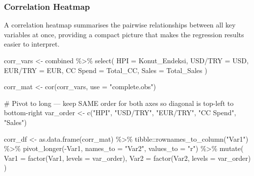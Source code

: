 \documentclass[
  11pt,
  a4paper,
]{article}
\newenvironment{Shaded}{\begin{snugshade}}{\end{snugshade}}
\newcommand{\AttributeTok}[1]{\textcolor[rgb]{0.40,0.45,0.13}{#1}}
\newcommand{\CommentTok}[1]{\textcolor[rgb]{0.37,0.37,0.37}{#1}}
\newcommand{\FunctionTok}[1]{\textcolor[rgb]{0.28,0.35,0.67}{#1}}
\newcommand{\NormalTok}[1]{\textcolor[rgb]{0.00,0.23,0.31}{#1}}
\newcommand{\OtherTok}[1]{\textcolor[rgb]{0.00,0.23,0.31}{#1}}
\newcommand{\SpecialCharTok}[1]{\textcolor[rgb]{0.37,0.37,0.37}{#1}}
\newcommand{\StringTok}[1]{\textcolor[rgb]{0.13,0.47,0.30}{#1}}
\begin{document}
\subsubsection{Correlation Heatmap}\label{correlation-heatmap}

A correlation heatmap summarises the pairwise relationships between all
key variables at once, providing a compact picture that makes the
regression results easier to interpret.

\begin{Shaded}
\begin{Highlighting}[]
\NormalTok{corr\_vars }\OtherTok{\textless{}{-}}\NormalTok{ combined }\SpecialCharTok{\%\textgreater{}\%}
  \FunctionTok{select}\NormalTok{(}
    \AttributeTok{HPI        =}\NormalTok{ Konut\_Endeksi,}
    \StringTok{\textasciigrave{}}\AttributeTok{USD/TRY}\StringTok{\textasciigrave{}}  \OtherTok{=}\NormalTok{ USD,}
    \StringTok{\textasciigrave{}}\AttributeTok{EUR/TRY}\StringTok{\textasciigrave{}}  \OtherTok{=}\NormalTok{ EUR,}
    \StringTok{\textasciigrave{}}\AttributeTok{CC Spend}\StringTok{\textasciigrave{}} \OtherTok{=}\NormalTok{ Total\_CC,}
    \AttributeTok{Sales      =}\NormalTok{ Total\_Sales}
\NormalTok{  )}

\NormalTok{corr\_mat }\OtherTok{\textless{}{-}} \FunctionTok{cor}\NormalTok{(corr\_vars, }\AttributeTok{use =} \StringTok{"complete.obs"}\NormalTok{)}

\CommentTok{\# Pivot to long — keep SAME order for both axes so diagonal is top{-}left to bottom{-}right}
\NormalTok{var\_order }\OtherTok{\textless{}{-}} \FunctionTok{c}\NormalTok{(}\StringTok{"HPI"}\NormalTok{, }\StringTok{"USD/TRY"}\NormalTok{, }\StringTok{"EUR/TRY"}\NormalTok{, }\StringTok{"CC Spend"}\NormalTok{, }\StringTok{"Sales"}\NormalTok{)}

\NormalTok{corr\_df }\OtherTok{\textless{}{-}} \FunctionTok{as.data.frame}\NormalTok{(corr\_mat) }\SpecialCharTok{\%\textgreater{}\%}
\NormalTok{  tibble}\SpecialCharTok{::}\FunctionTok{rownames\_to\_column}\NormalTok{(}\StringTok{"Var1"}\NormalTok{) }\SpecialCharTok{\%\textgreater{}\%}
  \FunctionTok{pivot\_longer}\NormalTok{(}\SpecialCharTok{{-}}\NormalTok{Var1, }\AttributeTok{names\_to =} \StringTok{"Var2"}\NormalTok{, }\AttributeTok{values\_to =} \StringTok{"r"}\NormalTok{) }\SpecialCharTok{\%\textgreater{}\%}
  \FunctionTok{mutate}\NormalTok{(}
    \AttributeTok{Var1 =} \FunctionTok{factor}\NormalTok{(Var1, }\AttributeTok{levels =}\NormalTok{ var\_order),}
    \AttributeTok{Var2 =} \FunctionTok{factor}\NormalTok{(Var2, }\AttributeTok{levels =}\NormalTok{ var\_order)}
\NormalTok{  )}


\end{Highlighting}
\end{Shaded}
\end{document}
